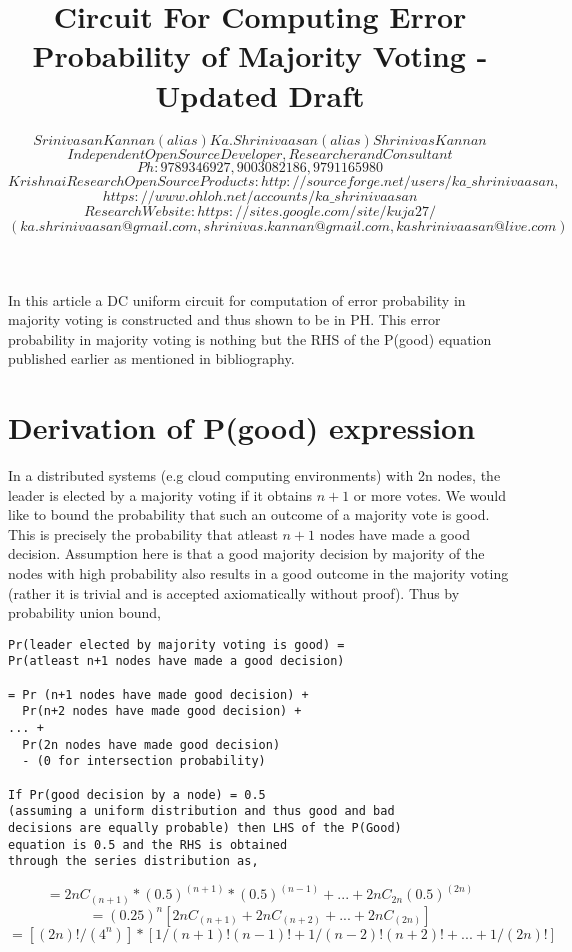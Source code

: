 \documentclass[11pt,onecolumn]{article}
\author{ $Srinivasan Kannan (alias) Ka.Shrinivaasan (alias) Shrinivas Kannan$ \\
$Independent Open Source Developer, Researcher and Consultant$ \\
$Ph: 9789346927, 9003082186, 9791165980$ \\
$Krishna iResearch OpenSource Products: http://sourceforge.net/users/ka\_shrinivaasan,$ \\ $https://www.ohloh.net/accounts/ka\_shrinivaasan$ \\
$Research Website: https://sites.google.com/site/kuja27/$ \\
$(ka.shrinivaasan@gmail.com, shrinivas.kannan@gmail.com, kashrinivaasan@live.com)$ 
}
\title{Circuit For Computing Error Probability of Majority Voting - Updated Draft}
\begin{document}
\thispagestyle{empty}
\pagestyle{empty}
\maketitle
\begin{onecolabstract}
In this article a DC uniform circuit for computation of error probability in majority voting is
constructed and thus shown to be in PH. This error probability in majority voting is nothing but
the RHS of the P(good) equation published earlier as mentioned in bibliography.
\end{onecolabstract}
\section{Derivation of P(good) expression}
In a distributed systems (e.g cloud computing environments) with 2n nodes, the leader is elected
by a majority voting if it obtains $n+1$ or more votes. We would like to bound the probability that
such an outcome of a majority vote is good. This is precisely the probability that atleast $n+1$
nodes have made a good decision. Assumption here is that a good majority decision by majority
of the nodes with high probability also results in a good outcome in the majority voting (rather it
is trivial and is accepted axiomatically without proof). Thus by probability union bound,
\begin{verbatim}
Pr(leader elected by majority voting is good) = 
Pr(atleast n+1 nodes have made a good decision)

= Pr (n+1 nodes have made good decision) +
  Pr(n+2 nodes have made good decision) +
... +
  Pr(2n nodes have made good decision)
  - (0 for intersection probability)

If Pr(good decision by a node) = 0.5 
(assuming a uniform distribution and thus good and bad
decisions are equally probable) then LHS of the P(Good) 
equation is 0.5 and the RHS is obtained
through the series distribution as,
\end{verbatim}
\begin{equation}
= 2nC_{(n+1)} * (0.5)^{(n+1)}*(0.5)^{(n-1)} + ... + 2nC_{2n} (0.5)^{(2n)}
\end{equation}
\begin{equation}
= (0.25)^{n} [ 2nC_{(n+1)} + 2nC_{(n+2)} + ... + 2nC_{(2n)} ]
\end{equation}
\begin{equation}
= [(2n)!/(4^{n})] * [ 1/(n+1)!(n-1)! +1/(n-2)!(n+2)! + ... + 1/(2n)!]
\end{equation}
\end{document}
